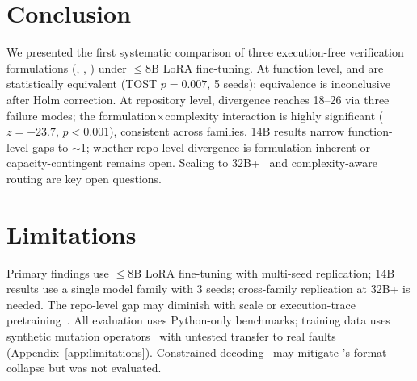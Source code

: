 \section{Conclusion}
\label{sec:conclusion}

We presented the first systematic comparison of three execution-free verification formulations (\cls{}, \cwm{}, \traj{}) under ${\leq}$8B LoRA fine-tuning. At function level, \cls{} and \cwm{} are statistically equivalent (TOST $p{=}0.007$, 5 seeds); \traj{} equivalence is inconclusive after Holm correction. At repository level, divergence reaches 18--26\pp{} via three failure modes; the formulation$\times$complexity interaction is highly significant ($z{=}-23.7$, $p{<}0.001$), consistent across families. 14B results narrow function-level gaps to ${\sim}$1\pp{}; whether repo-level divergence is formulation-inherent or capacity-contingent remains open. Scaling to 32B+~\cite{meta2025cwm} and complexity-aware routing are key open questions.

\section*{Limitations}

Primary findings use ${\leq}$8B LoRA fine-tuning with multi-seed replication; 14B results use a single model family with 3 seeds; cross-family replication at 32B+ is needed. The repo-level gap may diminish with scale or execution-trace pretraining~\cite{meta2025cwm}. All evaluation uses Python-only benchmarks; training data uses synthetic mutation operators~\cite{andrews2005mutation,just2014mutants} with untested transfer to real faults (Appendix~\ref{app:limitations}). Constrained decoding~\cite{poesia2022synchromesh,dong2024xgrammar,willard2023outlines} may mitigate \cwm{}'s format collapse but was not evaluated.